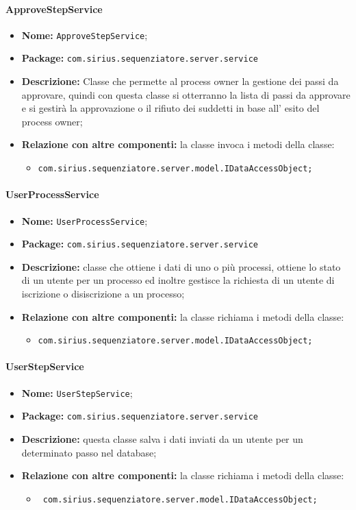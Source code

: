 \paragraph{ApproveStepService}
	\begin{itemize}
		\item \textbf{Nome:} \texttt{ApproveStepService};
		\item \textbf{Package:} \texttt{com.sirius.sequenziatore.server.service}
		\item \textbf{Descrizione:} Classe che permette al process owner la gestione dei passi da approvare, quindi con questa classe si otterranno la lista di passi da approvare e si gestirà la approvazione o il rifiuto dei suddetti in base all' esito del process owner;
		\item \textbf{Relazione con altre componenti:} la classe invoca i metodi della classe:
		\begin{itemize}
			\item \texttt{com.sirius.sequenziatore.server.model.IDataAccessObject;}
		\end{itemize}
	\end{itemize}
\paragraph{UserProcessService}
	\begin{itemize}
		\item \textbf{Nome:} \texttt{UserProcessService};
		\item \textbf{Package:} \texttt{com.sirius.sequenziatore.server.service}
		\item \textbf{Descrizione:} classe che ottiene i dati di uno o più processi, ottiene lo stato di un utente per un processo ed inoltre gestisce la richiesta di un utente di iscrizione o disiscrizione a un processo;
		\item \textbf{Relazione con altre componenti:} la classe richiama i metodi della classe:
		\begin{itemize}
			\item \texttt{com.sirius.sequenziatore.server.model.IDataAccessObject;}
		\end{itemize}
	\end{itemize}
\paragraph{UserStepService}
	\begin{itemize}
		\item \textbf{Nome:} \texttt{UserStepService};
		\item \textbf{Package:} \texttt{com.sirius.sequenziatore.server.service}
		\item \textbf{Descrizione:} questa classe salva i dati inviati da un utente per un determinato passo nel database;
		\item \textbf{Relazione con altre componenti:} la classe richiama i metodi della classe:
		\begin{itemize}
			\item \texttt{ com.sirius.sequenziatore.server.model.IDataAccessObject;}
		\end{itemize}
	\end{itemize}
